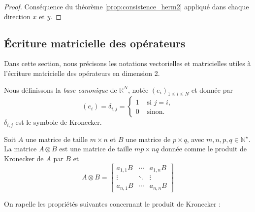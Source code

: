 \begin{proof}
Conséquence du théorème \ref{prop:consistence_herm2} appliqué dans chaque direction $x$ et $y$.
\end{proof}













\subsection{Écriture matricielle des opérateurs}

Dans cette section, nous précisons les notations vectorielles et matricielles utiles à l'écriture matricielle des opérateurs en dimension 2.

Nous définissons la \textit{base canonique} de $\mathbb{R}^N$, notée $\left(e_i \right)_{1 \leq i \leq N}$ et donnée par 
\begin{equation}
\left( e_i \right) = \delta_{i,j} = \left\lbrace
\begin{array}{rl}
1 & \text{ si } j=i,\\
0 & \text{ sinon.}
\end{array}
\right.
\end{equation}
$\delta_{i,j}$ est le symbole de Kronecker.

\begin{definition}
Soit $A$ une matrice de taille $m \times n$ et $B$ une matrice de $p \times q$, avec $m, n, p, q \in \mathbb{N}^{\star}$. La matrice $A \otimes B$ est une matrice de taille $mp \times nq$ donnée comme le produit de Kronecker de $A$ par $B$ et 
\begin{equation}
A \otimes B = 
\begin{bmatrix}
a_{1,1}B & \cdots & a_{1,n}B \\ 
\vdots & \ddots & \vdots \\ 
a_{n,1}B & \cdots & a_{n,n}B
\end{bmatrix} 
\end{equation}
\end{definition}
On rapelle les propriétés suivantes concernant le produit de Kronecker :

